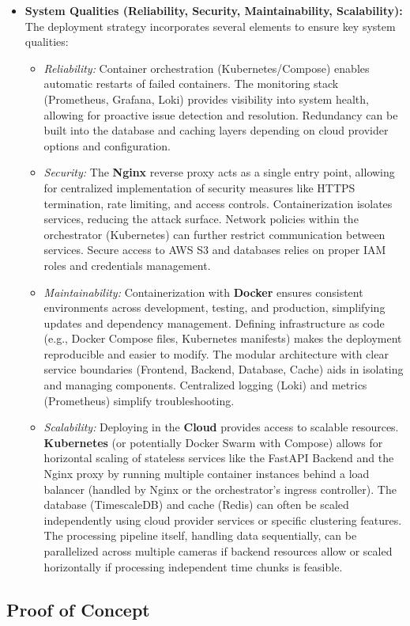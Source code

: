 \begin{itemize}
    \item \textbf{System Qualities (Reliability, Security, Maintainability, Scalability):}
        The deployment strategy incorporates several elements to ensure key system qualities:
        \begin{itemize}
            \item \textit{Reliability:} Container orchestration (Kubernetes/Compose) enables automatic restarts of failed containers. The monitoring stack (Prometheus, Grafana, Loki) provides visibility into system health, allowing for proactive issue detection and resolution. Redundancy can be built into the database and caching layers depending on cloud provider options and configuration.
            \item \textit{Security:} The \textbf{Nginx} reverse proxy acts as a single entry point, allowing for centralized implementation of security measures like HTTPS termination, rate limiting, and access controls. Containerization isolates services, reducing the attack surface. Network policies within the orchestrator (Kubernetes) can further restrict communication between services. Secure access to AWS S3 and databases relies on proper IAM roles and credentials management.
            \item \textit{Maintainability:} Containerization with \textbf{Docker} ensures consistent environments across development, testing, and production, simplifying updates and dependency management. Defining infrastructure as code (e.g., Docker Compose files, Kubernetes manifests) makes the deployment reproducible and easier to modify. The modular architecture with clear service boundaries (Frontend, Backend, Database, Cache) aids in isolating and managing components. Centralized logging (Loki) and metrics (Prometheus) simplify troubleshooting.
            \item \textit{Scalability:} Deploying in the \textbf{Cloud} provides access to scalable resources. \textbf{Kubernetes} (or potentially Docker Swarm with Compose) allows for horizontal scaling of stateless services like the FastAPI Backend and the Nginx proxy by running multiple container instances behind a load balancer (handled by Nginx or the orchestrator's ingress controller). The database (TimescaleDB) and cache (Redis) can often be scaled independently using cloud provider services or specific clustering features. The processing pipeline itself, handling data sequentially, can be parallelized across multiple cameras if backend resources allow or scaled horizontally if processing independent time chunks is feasible.
        \end{itemize}
\end{itemize}

\subsection{Proof of Concept}
\label{subsection:poc} %

\label{section:reflection} %
